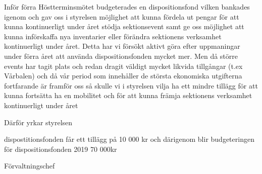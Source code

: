 \documentclass[../_main/handlingar.tex]{subfiles}
\begin{document}

Inför förra Höstterminsmötet budgeterades en dispositionsfond vilken bankades igenom och gav oss i styrelsen möjlighet att kunna fördela ut pengar för att kunna kontinuerligt under året stödja sektionsevent samt ge oss möjlighet att kunna införskaffa nya inventarier eller förändra sektionens verksamhet kontinuerligt under året. Detta har vi försökt aktivt göra efter uppmaningar under förra året att använda dispositionsfonden mycket mer. 
Men då större events har tagit plats och redan dragit väldigt mycket likvida tillgångar (t.ex  Vårbalen) och då vår period som innehåller de största ekonomiska utgifterna fortfarande är framför oss så skulle vi i styrelsen vilja ha ett mindre tillägg för att kunna fortsätta ha en mobilitet och för att kunna främja sektionens verksamhet kontinuerligt under året

Därför yrkar styrelsen
\begin{attsatser}
    \att dispostitionsfonden får ett tillägg på 10 000 kr och därigenom blir budgeteringen för dispositionsfonden 2019 70 000kr

\end{attsatser}

\begin{signatures}{1}
    \ist
    \signature{\fvc}{Förvaltningschef}
\end{signatures}
\end{document}
